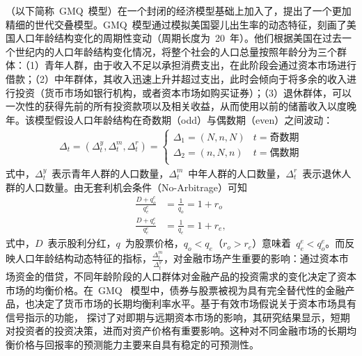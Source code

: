（以下简称~GMQ~模型）在一个封闭的经济模型基础上加入了\dsf{}，提出了一个更加精细的世代交叠模型。GMQ~模型通过模拟美国婴儿出生率的动态特征，刻画了美国人口年龄结构变化的周期性变动（周期长度为~20~年）。他们根据美国在过去一个世纪内的人口年龄结构变化情况，将整个社会的人口总量按照年龄分为三个群体：（1）青年人群，由于收入不足以承担消费支出，在此阶段会通过资本市场进行借款；（2）中年群体，其收入迅速上升并超过支出，此时会倾向于将多余的收入进行投资（货币市场如银行机构，或者资本市场如购买证券）；（3）退休群体，可以一次性的获得先前的所有投资款项以及相关收益，从而使用以前的储蓄收入以度晚年。该模型假设人口年龄结构在奇数期（odd）与偶数期（even）之间波动：
\begin{align}
  \Delta_t = (\Delta_t^y, \Delta_t^m, \Delta_t^r) =
      \left\{
    \begin{array}{cc}
      \Delta_1 = (N,n,N) & t=\text{奇数期} \\
      \Delta_2 = (n,N,n) & t=\text{偶数期} \\
    \end{array}
    \right.
\end{align}
式中，$\Delta_t^y$~表示青年人群的人口数量，$\Delta_t^m$~中年人群的人口数量，$\Delta_t^r$~表示退休人群的人口数量。由无套利机会条件（No-Arbitrage）可知
 \begin{align*}
  \frac{D+q_o^e}{q_e^e} & = \frac{1}{q_o} = 1+r_o \\
  \frac{D+q_e^e}{q_e^e} & = \frac{1}{q_e} = 1+r_e,
 \end{align*}
式中，$D$~表示股利分红，$q$~为股票价格，$q_o<q_e$（$r_o>r_e$）意味着~$q_e^e<q_o^e$。而反映人口年龄结构动态特征的指标，$\frac{\Delta_t^m}{\Delta_t^y}$，对金融市场产生重要的影响：通过资本市场资金的借贷，不同年龄阶段的人口群体对金融产品的投资需求的变化决定了资本市场的均衡价格。在~GMQ~ 模型中，债券与股票被视为具有完全替代性的金融产品，\dsf 也决定了货币市场的长期均衡利率水平。基于有效市场假说关于资本市场具有信号指示的功能， 探讨了\dsf 对即期与远期资本市场的影响，其研究结果显示，短期\dsf 对投资者的投资决策，进而对资产价格有重要影响。这种对不同金融市场的长期均衡价格与回报率的预测能力主要来自\dsf 具有稳定的可预测性。

